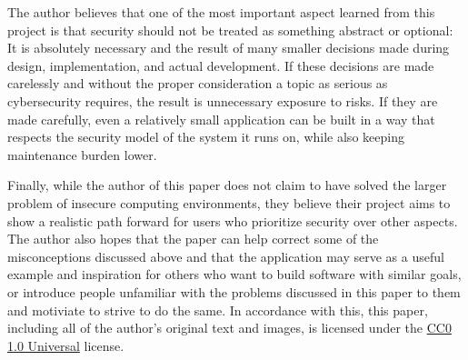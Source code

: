\documentclass[a4paper,12pt]{report}
\begin{document}
The author believes that one of the most important aspect learned from this project is that security should not be treated as something abstract or optional: It is absolutely necessary and the result of many smaller decisions made during design, implementation, and actual development. If these decisions are made carelessly and without the proper consideration a topic as serious as cybersecurity requires, the result is unnecessary exposure to risks. If they are made carefully, even a relatively small application can be built in a way that respects the security model of the system it runs on, while also keeping maintenance burden lower. 

Finally, while the author of this paper does not claim to have solved the larger problem of insecure computing environments, they believe their project aims to show a realistic path forward for users who prioritize security over other aspects. The author also hopes that the paper can help correct some of the misconceptions discussed above and that the application may serve as a useful example and inspiration for others who want to build software with similar goals, or introduce people unfamiliar with the problems discussed in this paper to them and motiviate to strive to do the same. In accordance with this, this paper, including all of the author's original text and images, is licensed under the \href{https://creativecommons.org/publicdomain/zero/1.0/}{CC0 1.0 Universal} license.
\end{document}
